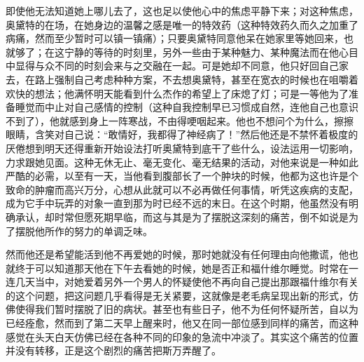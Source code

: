 \par 即使他无法知道她上哪儿去了，这也足以使他心中的焦虑平静下来；对这种焦虑，奥黛特的在场，在她身边的温馨之感是唯一的特效药（这种特效药久而久之加重了病痛，然而至少暂时可以镇一镇痛）；只要奥黛特同意他呆在她家里等她回来，也就够了；在这宁静的等待的时刻里，另外一些由于某种魅力、某种魔法而在他心目中显得与众不同的时刻会来与之交融在一起。可是她却不同意，他只好回自己家去，在路上强制自己考虑种种方案，不去想奥黛特，甚至在宽衣的时候也在咀嚼着欢快的想法；他满怀明天能看到什么杰作的希望上了床熄了灯；可是一等他为了准备睡觉而中止对自己感情的控制（这种自我控制早已习惯成自然，连他自己也意识不到了），他就感到身上一阵寒战，不由得哽咽起来。他也不想问个为什么，擦擦眼睛，含笑对自己说：“敢情好，我都得了神经病了！”然后他还是不禁怀着极度的厌倦想到明天还得重新开始设法打听奥黛特到底干了些什么，设法运用一切影响，力求跟她见面。这种无休无止、毫无变化、毫无结果的活动，对他来说是一种如此严酷的必需，以至有一天，当他看到腹部长了一个肿块的时候，他都为这也许是个致命的肿瘤而高兴万分，心想从此就可以不必再做任何事情，听凭这疾病的支配，成为它手中玩弄的对象一直到那为时已经不远的末日。在这个时期，他虽然没有明确承认，却时常但愿死期早临，而这与其是为了摆脱这深刻的痛苦，倒不如说是为了摆脱他所作的努力的单调乏味。
\par 然而他还是希望能活到他不再爱她的时候，那时她就没有任何理由向他撒谎，他也就终于可以知道那天他在下午去看她的时候，她是否正和福什维尔睡觉。时常在一连几天当中，对她爱着另外一个男人的怀疑使他不再向自己提出那跟福什维尔有关的这个问题，把这问题几乎看得是无关紧要，这就像是老毛病呈现出新的形式，仿佛使得我们暂时摆脱了旧的病状。甚至也有些日子，他不为任何怀疑所苦，自以为已经痊愈，然而到了第二天早上醒来时，他又在同一部位感到同样的痛苦，而这种感觉在头天白天仿佛已经在各种不同的印象的急流中冲淡了。其实这个痛苦的位置并没有转移，正是这个剧烈的痛苦把斯万弄醒了。
